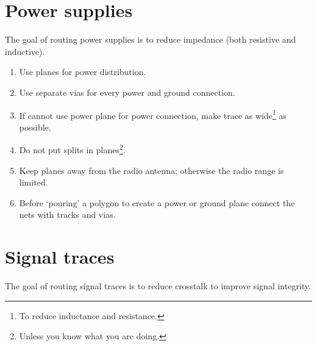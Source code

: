\section{Power supplies}

The goal of routing power supplies is to reduce impedance (both
resistive and inductive).

\begin{enumerate}

\item Use planes for power distribution.

\item Use separate vias for every power and ground connection.

\item If cannot use power plane for power connection, make trace as
  wide\footnote{To reduce inductance and resistance.} as possible.

\item Do not put splits in planes\footnote{Unless you know what you
  are doing.}.

\item Keep planes away from the radio antenna; otherwise the radio
  range is limited.

\item Before `pouring' a polygon to create a power or ground plane
  connect the nets with tracks and vias.
\end{enumerate}


\section{Signal traces}

The goal of routing signal traces is to reduce crosstalk to improve
signal integrity.



